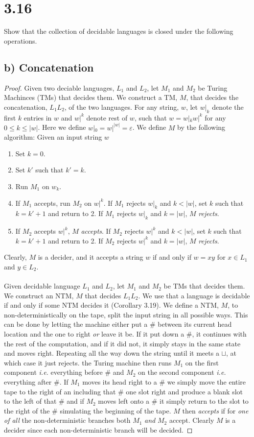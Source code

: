 \documentclass[a4paper,11pt]{article}
\newcommand{\abs}[1]{\left\lvert #1 \right\rvert}
\newcommand{\ie}{\emph{i.e.} }
\numberwithin{equation}{section}
\begin{document}
	\section*{3.16}
	Show that the collection of decidable languages is closed under the following operations.
	\subsection*{b) Concatenation}
	\begin{proof}
		Given two deciable languages, $L_1$ and $L_2$, let $M_1$ and $M_2$ be Turing Machinces (TMs) that decides them. We construct a TM, $M$, that decides the concatenation, $L_1L_2$, of the two languages. For any string, $w$, let $w|_{k}$ denote the first $k$ entries in $w$ and $w|^{k}$ denote rest of $w$, such that $w=w|_{k}w|^{k}$ for any $0\leq k\leq|w|$. Here we define $w|_0=w|^{\abs{w}}=\varepsilon$. We define $M$ by the following algorithm: Given an input string $w$\begin{enumerate}
			\item Set $k=0$.
			\item Set $k' $ such that $ k'=k $.
			\item Run $M_1$ on $w_k$.
			\item If $M_1$ accepts, run $M_2$ on $w|^{k}$. If $M_1$ rejects $w|_k$ and $k<\abs{w}$, set $k $ such that $k=k'+1$ and return to 2. If $M_1$ rejects $w|_k$ and $k=\abs{w}$, $M$ \emph{rejects}.
			\item If $M_2$ accepts $w|^{k}$, $M$ \emph{accepts}. If $M_2$ rejects $w|^{k}$ and $k<\abs{w}$, set $k $ such that $k=k'+1$ and return to 2. If $M_2$ rejects $w|^k$ and $k=\abs{w}$, $M$ \emph{rejects}.
		\end{enumerate}
		Clearly, $M$ is a decider, and it accepts a string $w$ if and only if $w=xy$ for $x\in L_1$ and $y\in L_2$.\\
			\\
			Given decidable language $L_1$ and $ L_2 $, let $M_1$ and $ M_2 $ be TMs that decides them. We construct an NTM, $M$ that decides $L_1L_2$. We use that a language is decidable if and only if some NTM decides it (Corollary 3.19). We define a NTM, $M$, to non-deterministically on the tape, split the input string in all possible ways. This can be done by letting the machine either put a $ \# $ between its current head location and the one to right \emph{or} leave it be. If it put down a $ \# $, it continues with the rest of the computation, and if it did not, it simply stays in the same state and moves right. Repeating all the way down the string until it meets a $ \sqcup $, at which case it just rejects. the Turing machine then runs $M_1$ on the first component \ie everything before $ \# $ and $ M_2 $ on the second component \ie everything after $ \# $. If $M_1$ moves its head right to a $\#$ we simply move the entire tape to the right of an including that $\#$ one slot right and produce a blank slot to the left of that $ \# $ and if $ M_2 $ moves left onto a $ \# $ it simply return to the slot to the right of the $ \# $ simulating the beginning of the tape. $M$ then \emph{accepts} if for \emph{one of all} the non-deterministic branches both $M_1$ \emph{and} $M_2$ accept. Clearly $ M $ is a decider since each non-deterministic branch will be decided.

\end{proof}
\end{document}
